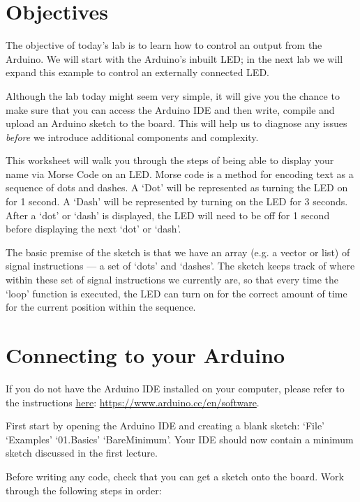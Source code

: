\documentclass[11pt,a4paper]{article}
\begin{document}
\pagestyle{fancy}

\section*{Objectives}

The objective of today's lab is to learn how to control an output from the Arduino. We will start with the Arduino's inbuilt LED; in the next lab we will expand this example to control an externally connected LED.

Although the lab today might seem very simple, it will give you the chance to make sure that you can access the Arduino IDE and then write, compile and upload an Arduino sketch to the board. This will help us to diagnose any issues \emph{before} we introduce additional components and complexity.

This worksheet will walk you through the steps of being able to display your name via Morse Code on an LED. Morse code is a method for encoding text as a sequence of dots and dashes. A `Dot' will be represented as turning the LED on for 1 second. A `Dash' will be represented by turning on the LED for 3 seconds. After a `dot' or `dash' is displayed, the LED will need to be off for 1 second before displaying the next `dot' or `dash'.

The basic premise of the sketch is that we have an array (e.g. a vector or list) of signal instructions --- a set of `dots' and `dashes'. The sketch keeps track of where within these set of signal instructions we currently are, so that every time the `loop' function is executed, the LED can turn on for the correct amount of time for the current position within the sequence.

\section{Connecting to your Arduino}
If you do not have the Arduino IDE installed on your computer, please refer to the instructions \href{https://www.arduino.cc/en/software}{\underline{here}}: \url{https://www.arduino.cc/en/software}.

First start by opening the Arduino IDE and creating a blank sketch: `File' \textrightarrow `Examples' \textrightarrow `01.Basics' \textrightarrow `BareMinimum'. Your IDE should now contain a minimum sketch discussed in the first lecture. 

Before writing any code, check that you can get a sketch onto the board. Work through the following steps in order:
\end{document}
